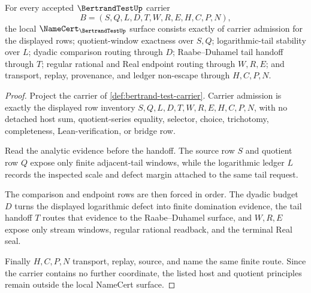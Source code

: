 \begin{theorem}
\label{thm:bertrand-test-namecert-obligations}
For every accepted $\BertrandTestUp$ carrier
$$
B=(S,Q,L,D,T,W,R,E,H,C,P,N),
$$
the local $\NameCert_{\BertrandTestUp}$ surface consists exactly of carrier admission for the displayed rows; quotient-window exactness over $S,Q$; logarithmic-tail stability over $L$; dyadic comparison routing through $D$; Raabe--Duhamel tail handoff through $T$; regular rational and Real endpoint routing through $W,R,E$; and transport, replay, provenance, and ledger non-escape through $H,C,P,N$.
\end{theorem}
\begin{proof}
Project the carrier of \autoref{def:bertrand-test-carrier}. Carrier admission is exactly the displayed row inventory $S,Q,L,D,T,W,R,E,H,C,P,N$, with no detached host sum, quotient-series equality, selector, choice, trichotomy, completeness, Lean-verification, or bridge row.

Read the analytic evidence before the handoff. The source row $S$ and quotient row $Q$ expose only finite adjacent-tail windows, while the logarithmic ledger $L$ records the inspected scale and defect margin attached to the same tail request.

The comparison and endpoint rows are then forced in order. The dyadic budget $D$ turns the displayed logarithmic defect into finite domination evidence, the tail handoff $T$ routes that evidence to the Raabe--Duhamel surface, and $W,R,E$ expose only stream windows, regular rational readback, and the terminal Real seal.

Finally $H,C,P,N$ transport, replay, source, and name the same finite route. Since the carrier contains no further coordinate, the listed host and quotient principles remain outside the local NameCert surface.
\end{proof}


